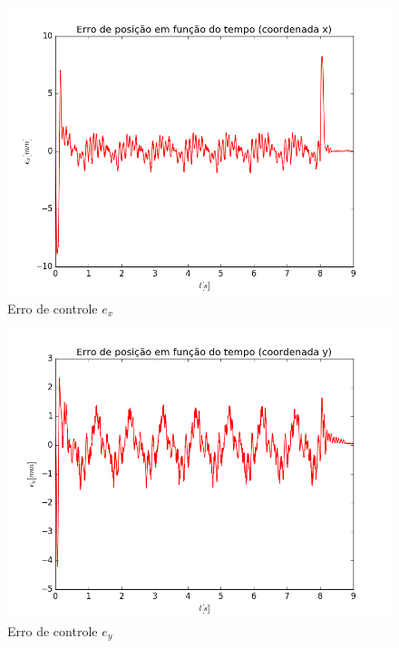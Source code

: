 \documentclass[]{politex}
\begin{document}
\begin{multicols}{2}
\begin{figure}[H]
	\centering
	\includegraphics[scale=0.39]{../../../Experimental/Aquisicoes/SMCx_circulo/ex.png}  
	\caption{Erro de controle $e_x$}
	\label{fig:SMCx_circulo_ex}
\end{figure}
\begin{figure}[H]
	\centering
	\includegraphics[scale=0.39]{../../../Experimental/Aquisicoes/SMCx_circulo/ey.png}  
	\caption{Erro de controle $e_y$}
	\label{fig:SMCx_circulo_ey}
\end{figure}
\end{multicols}
\end{document}
